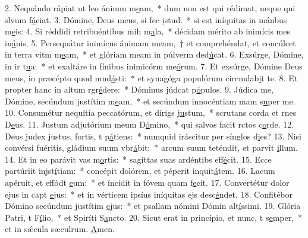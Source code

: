 2. Nequándo rápiat ut leo ánimm m\uline{e}am,~* dum non est qui rédimat, neque qui slvum f\uline{á}ciat.
3. Dómine, Deus meus, si fec \uline{i}stud.~* si est iníquitas in mánbus m\uline{e}is:
4. Si réddidi retribuéntibus mih m\uline{a}la,~* décidam mérito ab inimícis mes in\uline{á}nis.
5. Persequátur inimícus ánimam meam,~† et comprehéndat, et concúlcet in terra vitm m\uline{e}am,~* et glóriam meam in púlverm ded\uline{ú}cat.
6. Exsúrge, Dómine, in ir t\uline{u}a:~* et exaltáre in fínibus inimicórm me\uline{ó}rum.
7. Et exsúrge, Dómine Deus meus, in præcépto quod mnd\uline{á}sti:~* et synagóga populórum circmdab\uline{i}t te.
8. Et propter hanc in altum rgr\uline{é}dere:~* Dóminus júdcat p\uline{ó}pulos.
9. Júdica me, Dómine, secúndum justítim m\uline{e}am,~* et secúndum innocéntiam mam s\uline{u}per me.
10. Consumétur nequítia peccatórum, et dírigs j\uline{u}stum,~* scrutans corda et rnes D\uline{e}us.
11. Justum adjutórium meum  D\uline{ó}mino,~* qui salvos facit rctos c\uline{o}rde.
12. Deus judex justus, fortis, t p\uline{á}tiens:~* numquid iráscitur per sínglos d\uline{i}es?
13. Nisi convérsi fuéritis, gládium suum vbr\uline{á}bit:~* arcum suum teténdit, et parvit \uline{i}llum.
14. Et in eo parávit vas m\uline{o}rtis:~* sagíttas suas ardéntibs eff\uline{é}cit.
15. Ecce partúriit injst\uline{í}tiam:~* concépit dolórem, et péperit inquit\uline{á}tem.
16. Lacum apéruit, et effódt \uline{e}um:~* et íncidit in fóvem quam f\uline{e}cit.
17. Convertétur dolor ejus in capt \uline{e}jus:~* et in vérticem ipsíus iníquitas ejs desc\uline{é}ndet.
18. Confitébor Dómino secúndum justítim \uline{e}jus:~* et psallam nómini Dómin alt\uline{í}ssimi.
19. Glória Patri, t F\uline{í}lio,~* et Spiríti S\uline{a}ncto.
20. Sicut erat in princípio, et nunc, t s\uline{e}mper,~* et in sǽcula sæculrum. \uline{A}men.
